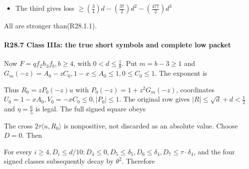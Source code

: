 
\begin{itemize}
\item The third gives loss \(\ge (\frac{3}{4})d-(\frac{37}{2})d^2-(\frac{477}{2})d^3\)
\end{itemize}


All are stronger than(R28.1.1).

\paragraph{R28.7 Class IIIa: the true short symbols and complete low packet}

Now \(F=q f_{2} h_{3} f_b,\allowbreak \allowbreak b\ge 4\), with \(0<d\le \frac{1}{8}\). Put \(m=b-3\ge 1\) and \(G_m(-z)=A_0-z C_0,\allowbreak \allowbreak 1-x\le A_0\le 1,\allowbreak \allowbreak 0\le C_0\le 1\). The exponent is


Thus \(R_0=zP_{0}(-z)u\) with \(P_0(-z)=1+z^2G_m(-z)\), coordinates \(U_0=1-xA_{0},\allowbreak \allowbreak V_0=-xC_{0}\le 0,\allowbreak \allowbreak \lvert P_0\rvert \le 1\). The original row gives \(\lvert R\rvert \le \sqrt{d}+d<\frac{1}{2}\) and \(\eta=\frac{6}{5}\) is legal. The full signed square obeys


The cross \(2\tau\langle u,\allowbreak \allowbreak R_0\rangle \) is nonpositive, not discarded as an absolute value. Choose \(D=0\). Then


For every \(i\ge 4,\allowbreak \allowbreak D_i\le d/10: D_4\le 0,\allowbreak \allowbreak D_5\le \delta_5,\allowbreak \allowbreak D_6\le \delta_4,\allowbreak \allowbreak D_7\le \tau\cdot \delta_4\), and the four signed classes subsequently decay by \(\theta^2\). Therefore

